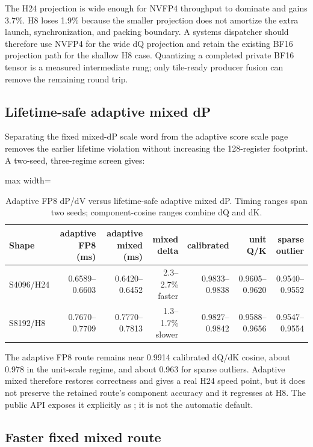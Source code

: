 The H24 projection is wide enough for NVFP4 throughput to dominate and gains
3.7\%.  H8 loses 1.9\% because the smaller projection does not amortize the
extra launch, synchronization, and packing boundary.  A systems dispatcher
should therefore use NVFP4 for the wide dQ projection and retain the existing
BF16 projection path for the shallow H8 case.  Quantizing a completed private
BF16 tensor is a measured intermediate rung; only tile-ready producer fusion
can remove the remaining round trip.

\subsection{Lifetime-safe adaptive mixed dP}

Separating the fixed mixed-dP scale word from the adaptive score scale page
removes the earlier lifetime violation without increasing the 128-register
footprint.  A two-seed, three-regime screen gives:

\begin{table}[htbp]
\centering
\caption{Adaptive FP8 dP/dV versus lifetime-safe adaptive mixed dP.  Timing
ranges span two seeds; component-cosine ranges combine dQ and dK.}
\label{tab:adaptive-mixed}
\scriptsize
\begin{adjustbox}{max width=\textwidth}
\begin{tabular}{l rr r rrr}
\toprule
Shape & adaptive FP8 (ms) & adaptive mixed (ms) & mixed delta & calibrated & unit Q/K & sparse outlier \\
\midrule
S4096/H24 & 0.6589--0.6603 & 0.6420--0.6452 & 2.3--2.7\% faster & 0.9833--0.9838 & 0.9605--0.9620 & 0.9540--0.9552 \\
S8192/H8  & 0.7670--0.7709 & 0.7770--0.7813 & 1.3--1.7\% slower & 0.9827--0.9842 & 0.9588--0.9656 & 0.9547--0.9554 \\
\bottomrule
\end{tabular}
\end{adjustbox}
\end{table}

The adaptive FP8 route remains near 0.9914 calibrated dQ/dK cosine, about
0.978 in the unit-scale regime, and about 0.963 for sparse outliers.  Adaptive
mixed therefore restores correctness and gives a real H24 speed point, but it
does not preserve the retained route's component accuracy and it regresses at
H8.  The public API exposes it explicitly as ; it is not
the automatic default.

\subsection{Faster fixed mixed route}

